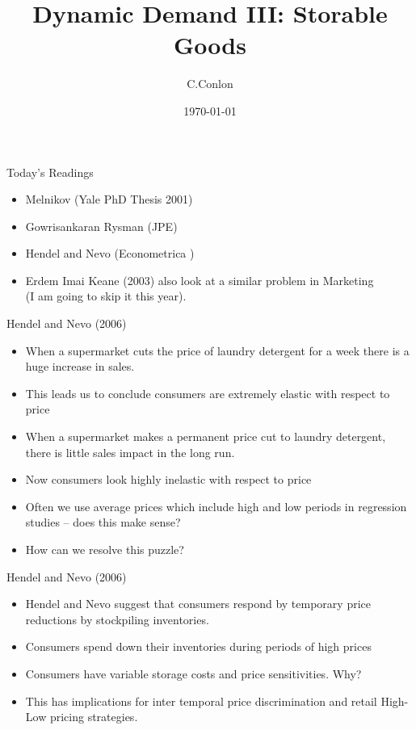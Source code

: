 



\title [Dynamic Demand III]{Dynamic Demand III:
 Storable Goods }
\author{C.Conlon}
\date{\today}




\begin{frame}
\titlepage
\end{frame}

\begin{frame}{Today's Readings}
\begin{itemize}
\item Melnikov (Yale PhD Thesis 2001)
\item Gowrisankaran Rysman (JPE)
\item \alert{Hendel and Nevo (Econometrica )}
\item Erdem Imai Keane (2003) also look at a similar problem in Marketing\\
(I am going to skip it this year).
\end{itemize}
\end{frame}


\begin{frame}{Hendel and Nevo (2006)}
\begin{itemize}
\item When a supermarket cuts the price of laundry detergent for a week there is a huge increase in sales.
\item This leads us to conclude consumers are extremely elastic with respect to price
\item When a supermarket makes a permanent price cut to laundry detergent, there is little sales impact in the long run.
\item Now consumers look highly inelastic with respect to price
\item Often we use average prices which include high and low periods in regression studies -- does this make sense?
\item How can we resolve this puzzle?
\end{itemize}
\end{frame}

\begin{frame}{Hendel and Nevo (2006)}
\begin{itemize}
\item Hendel and Nevo suggest that consumers respond by temporary price  reductions by stockpiling inventories.
\item Consumers spend down their inventories during periods of high prices
\item Consumers have variable storage costs and price sensitivities. Why?
\item This has implications for inter temporal price discrimination and retail High-Low pricing strategies.
\end{itemize}
\end{frame}

